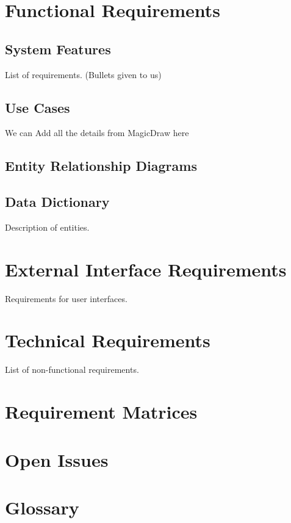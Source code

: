 \documentclass[12pt]{article}
\begin{document}
\section{Functional Requirements}

\subsection{System Features}
List of requirements. (Bullets given to us)

\newpage %
\subsection{Use Cases}
We can Add all the details from MagicDraw here
\begin{center}

\end{center}


\newpage

\subsection{Entity Relationship Diagrams}

\subsection{Data Dictionary}
Description of entities.

\section{External Interface Requirements}
Requirements for user interfaces.

\section{Technical Requirements}
List of non-functional requirements.

\section{Requirement Matrices}

\section{Open Issues}

\section{Glossary}
\end{document}
